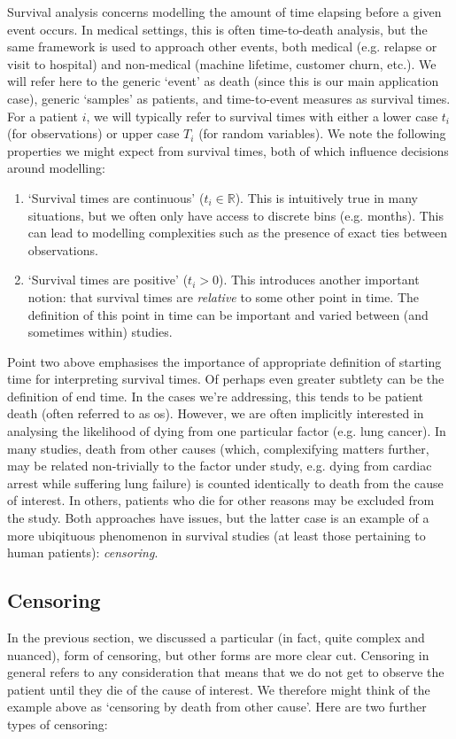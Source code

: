 \documentclass[../thesis.tex]{subfiles}
\begin{document}
Survival analysis concerns modelling the amount of time elapsing before a given event occurs. In medical settings, this is often time-to-death analysis, but the same framework is used to approach other events, both medical (e.g. relapse or visit to hospital) and non-medical (machine lifetime, customer churn, etc.). We will refer here to the generic `event' as death (since this is our main application case), generic `samples' as patients, and time-to-event measures as survival times. For a patient $i$, we will typically refer to survival times with either a lower case $t_i$ (for observations) or upper case $T_i$ (for random variables). We note the following properties we might expect from survival times, both of which influence decisions around modelling:
\begin{enumerate}
    \item `Survival times are continuous' ($t_i \in \mathbb{R}$). This is intuitively true in many situations, but we often only have access to discrete bins (e.g. months). This can lead to modelling complexities such as the presence of exact ties between observations.
    \item `Survival times are positive' ($t_i > 0$). This introduces another important notion: that survival times are \emph{relative} to some other point in time. The definition of this point in time can be important and varied between (and sometimes within) studies.
\end{enumerate}
Point two above emphasises the importance of appropriate definition of starting time for interpreting survival times. Of perhaps even greater subtlety can be the definition of end time. In the cases we're addressing, this tends to be patient death (often referred to as \gls{os}). However, we are often implicitly interested in analysing the likelihood of dying from one particular factor (e.g. lung cancer). In many studies, death from other causes (which, complexifying matters further, may be related non-trivially to the factor under study, e.g. dying from cardiac arrest while suffering lung failure) is counted identically to death from the cause of interest. In others, patients who die for other reasons may be excluded from the study. Both approaches have issues, but the latter case is an example of a more ubiqituous phenomenon in survival studies (at least those pertaining to human patients): \emph{censoring}.

\subsection{Censoring}
In the previous section, we discussed a particular (in fact, quite complex and nuanced), form of censoring, but other forms are more clear cut. Censoring in general refers to any consideration that means that we do not get to observe the patient until they die of the cause of interest. We therefore might think of the example above as `censoring by death from other cause'. Here are two further types of censoring:
\end{document}
